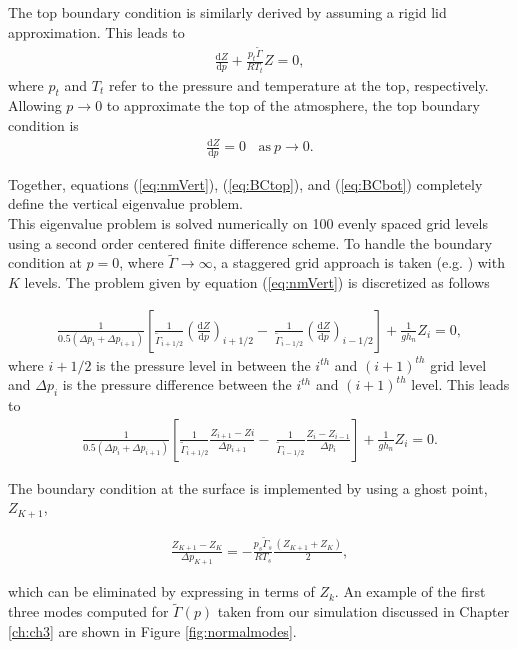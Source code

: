 The top boundary condition is similarly derived by assuming a rigid lid approximation. This leads to 
\begin{align}
\frac{\text{d}Z}{\text{d}p} + \frac{p_t\tilde{\Gamma}}{RT_t} Z = 0,
\end{align}
where $p_t$ and $T_t$ refer to the pressure and temperature at the top, respectively. Allowing $p \to 0$ to approximate the top of the atmosphere, the top boundary condition is
\begin{align}
\frac{\text{d}Z}{\text{d}p} = 0 ~~~~\text{as}~ p \to 0.\label{eq:BCtop}
\end{align}

Together, equations (\ref{eq:nmVert}), (\ref{eq:BCtop}), and (\ref{eq:BCbot}) completely define the vertical eigenvalue problem.\\

This eigenvalue problem is solved numerically on 100 evenly spaced grid levels using a second order centered finite difference scheme. To handle the boundary condition at $p = 0$, where $\tilde{\Gamma} \to \infty$, a staggered grid approach is taken (e.g. \cite{Kasahara1981}) with $K$ levels. The problem given by equation (\ref{eq:nmVert}) is discretized as follows

\begin{align}
\frac{1}{0.5(\Delta p_i + \Delta p_{i+1})} \left[\frac{1}{\tilde{\Gamma}_{i+1/2}} \left(\frac{\text{d} Z}{\text{d} p}\right)_{i+1/2}  - ~\frac{1}{\tilde{\Gamma}_{i-1/2}} \left(\frac{\text{d} Z}{\text{d} p}\right)_{i-1/2} \right] + \frac{1}{gh_n} Z_i = 0,
\end{align}
where $i+1/2$ is the pressure level in between the $i^{th}$ and $(i+1)^{th}$ grid level and $\Delta p_i$ is the pressure difference between the $i^{th}$ and $(i+1)^{th}$ level. This leads to
\begin{align}
\frac{1}{0.5(\Delta p_i + \Delta p_{i+1})} \left[\frac{1}{\tilde{\Gamma}_{i+1/2}} \frac{Z_{i+1} - Z{i}}{\Delta p_{i+1}}  - ~\frac{1}{\tilde{\Gamma}_{i-1/2}} \frac{Z_i - Z_{i-1}}{\Delta p_i} \right] + \frac{1}{gh_n} Z_i = 0.
\end{align}

The boundary condition at the surface is implemented by using a ghost point, $Z_{K+1}$,

\begin{align}
\frac{Z_{K+1} - Z_K}{\Delta p_{K+1}} = -\frac{p_s \tilde{\Gamma}_s}{RT_s} \frac{(Z_{K+1} + Z_K)}{2},
\end{align}

which can be eliminated by expressing in terms of $Z_k$. An example of the first three modes computed for $\tilde{\Gamma}(p)$ taken from our simulation discussed in Chapter \ref{ch:ch3} are shown in Figure \ref{fig:normalmodes}.

